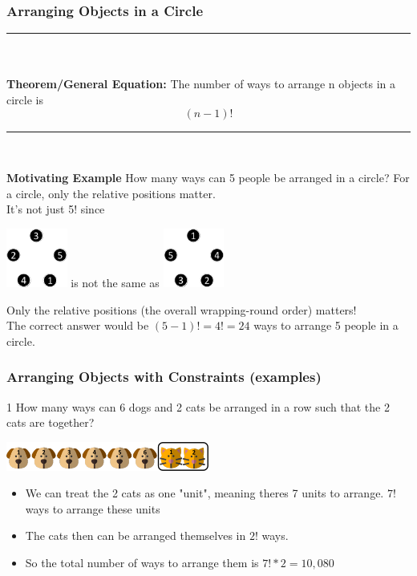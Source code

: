 \documentclass[12pt, letterpaper]{article}
\newcommand{\exheader}[1][ex]{{\tiny{#1}\normalsize}}
\newcommand{\horizline}[0]{\noindent\rule{\textwidth}{1pt}\\}
\begin{document}
\pagebreak

\subsubsection{Arranging Objects in a Circle}

\horizline \vspace*{-0.5cm} \\
\textbf{Theorem/General Equation:} The number of ways to arrange n objects in a circle is \\ \[(n-1)!\]
\vspace*{-0.5cm} \horizline \vspace*{-0.05cm}

\textbf{Motivating Example}
How many ways can 5 people be arranged in a circle? For a circle, only the relative positions matter. \\ 
It's not just 5! since \\ 

\begin{center}
	\includegraphics[width=2cm]{images/counting/circle1.png} is not the same as \includegraphics[width=2cm]{images/counting/circle2.png}	
\end{center}

Only the relative positions (the overall wrapping-round order) matters! \\ 
The correct answer would be $(5-1)! = 4! = 24$ ways to arrange 5 people in a circle.

\pagebreak

\subsubsection{Arranging Objects with Constraints (examples)}

\exheader[1] How many ways can 6 dogs and 2 cats be arranged in a row such that the 2 cats are together?
\begin{center}
	\includegraphics[width=0.5\textwidth]{images/counting/catsdogs1.png}	
\end{center}
\begin{itemize}[leftmargin=*,  label={}]
	\item We can treat the 2 cats as one "unit", meaning theres 7 units to arrange. $7!$ ways to arrange these units
	\item The cats then can be arranged themselves in $2!$ ways.
	\item So the total number of ways to arrange them is $7! * 2 = 10,080$
\end{itemize}
\end{document}
